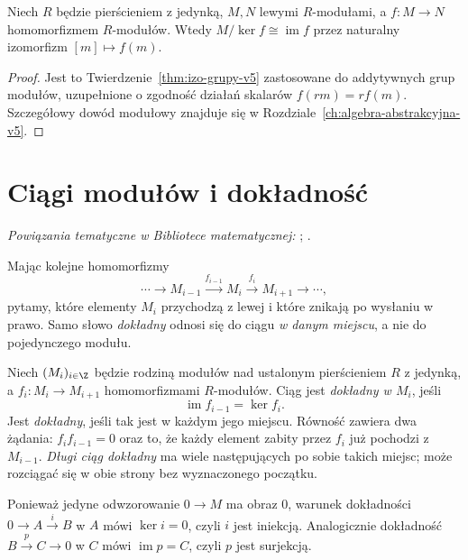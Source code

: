 \begin{twierdzenie}
\label{thm:modul-izomorfizm}
Niech $R$ będzie pierścieniem z jedynką, $M,N$ lewymi
$R$-modułami, a $f:M\to N$ homomorfizmem $R$-modułów.
Wtedy $M/\ker f\cong\operatorname{im}f$ przez naturalny
izomorfizm $[m]\mapsto f(m)$.
\end{twierdzenie}
\begin{proof}
Jest to Twierdzenie~\ref{thm:izo-grupy-v5} zastosowane do
addytywnych grup modułów, uzupełnione o zgodność działań skalarów
$f(rm)=rf(m)$. Szczegółowy dowód modułowy znajduje się
w Rozdziale~\ref{ch:algebra-abstrakcyjna-v5}.
\end{proof}

\section{Ciągi modułów i dokładność}
\label{sec:dokladnosc-modulow}

\noindent\emph{Powiązania tematyczne w Bibliotece matematycznej:} ; .


Mając kolejne homomorfizmy
\[
 \cdots\longrightarrow M_{i-1}
 \xrightarrow{f_{i-1}}M_i
 \xrightarrow{f_i}M_{i+1}
 \longrightarrow\cdots,
\]
pytamy, które elementy $M_i$ przychodzą z lewej
i które znikają po wysłaniu w prawo.
Samo słowo \emph{dokładny} odnosi się do
ciągu \emph{w danym miejscu}, a nie do
pojedynczego modułu.

\begin{definicja}
\label{def:ciag-dokladny}
Niech $(M_i)_{i\in\Z}$ będzie rodziną modułów nad
ustalonym pierścieniem $R$ z jedynką, a
$f_i:M_i\to M_{i+1}$ homomorfizmami $R$-modułów.
Ciąg jest \emph{dokładny w $M_i$}, jeśli
\[
 \operatorname{im}f_{i-1}=\ker f_i.
\]
Jest \emph{dokładny}, jeśli tak jest
w każdym jego miejscu. Równość zawiera
dwa żądania: $f_i f_{i-1}=0$ oraz to,
że każdy element zabity przez $f_i$
już pochodzi z $M_{i-1}$.
\emph{Długi ciąg dokładny} ma wiele
następujących po sobie takich miejsc;
może rozciągać się w obie strony
bez wyznaczonego początku.
\end{definicja}

Ponieważ jedyne odwzorowanie $0\to M$ ma obraz $0$,
warunek dokładności $0\to A\xrightarrow{i}B$
w $A$ mówi $\ker i=0$, czyli $i$ jest iniekcją.
Analogicznie dokładność
$B\xrightarrow{p}C\to0$ w $C$ mówi
$\operatorname{im}p=C$, czyli $p$ jest surjekcją.

